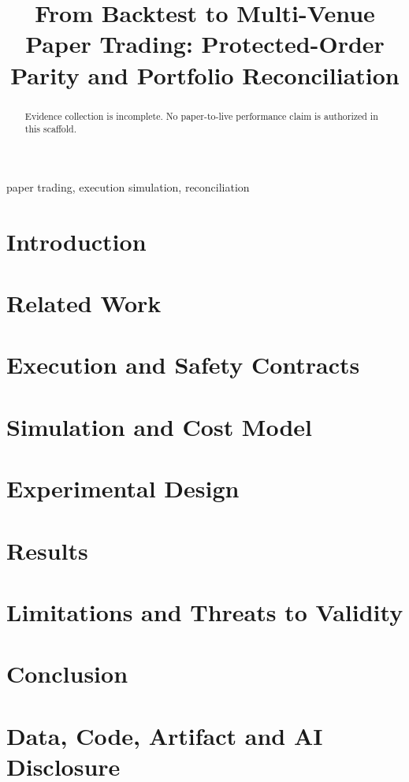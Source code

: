\documentclass[conference]{IEEEtran}
\title{From Backtest to Multi-Venue Paper Trading: Protected-Order Parity and Portfolio Reconciliation}
\author{\IEEEauthorblockN{Harvey}}
\begin{document}
\maketitle
\begin{abstract}
Evidence collection is incomplete. No paper-to-live performance claim is authorized in this scaffold.
\end{abstract}
\begin{IEEEkeywords}
paper trading, execution simulation, reconciliation
\end{IEEEkeywords}
\section{Introduction}
\section{Related Work}
\section{Execution and Safety Contracts}
\section{Simulation and Cost Model}
\section{Experimental Design}
\section{Results}
\section{Limitations and Threats to Validity}
\section{Conclusion}
\section*{Data, Code, Artifact and AI Disclosure}


\end{document}
